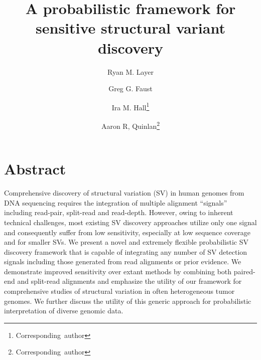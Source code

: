 \documentclass[11pt]{article}
\begin{document}
\title{A probabilistic framework for sensitive structural variant discovery}
%

\author[1]{Ryan M. Layer}
\author[1]{Greg G. Faust}
\author[2]{Ira M. Hall\thanks{\mbox{Corresponding author}}}
\author[2,3]{Aaron R, Quinlan\thanks{\mbox{Corresponding author}}}


\maketitle

\section{Abstract}
Comprehensive discovery of structural variation (SV) in human genomes from DNA
sequencing requires the integration of multiple alignment ``signals'' including
read-pair, split-read and read-depth. However, owing to inherent technical 
challenges, most existing SV discovery approaches utilize only one signal and
consequently suffer from low sensitivity, especially at low sequence coverage 
and for smaller SVs. We present a novel and extremely flexible probabilistic 
SV discovery framework that is capable of integrating any number of SV 
detection signals including those generated from read alignments or prior
evidence. We demonstrate improved sensitivity over extant methods by combining 
both paired-end and split-read alignments and emphasize the utility of our 
framework for comprehensive studies of structural variation in often 
heterogeneous tumor genomes. We further discuss the utility of this generic 
approach for probabilistic interpretation of diverse genomic data.
\end{document}
